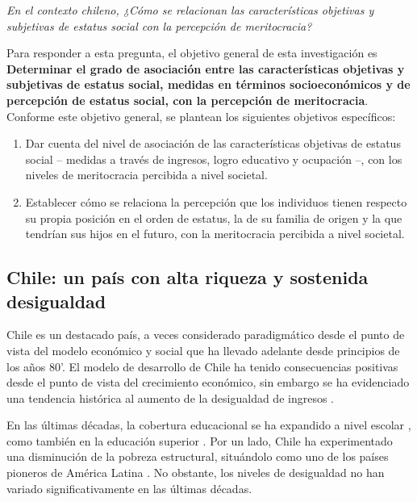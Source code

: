 \documentclass[12pt]{article}
\begin{document}
\begin{center}
\textit{En el contexto chileno, ¿Cómo se relacionan las características objetivas y subjetivas de estatus social con la percepción de meritocracia?}
\end{center}
	
Para responder a esta pregunta, el objetivo general de esta investigación es \textbf{Determinar el grado de asociación entre las características objetivas y subjetivas de estatus social, medidas en términos socioeconómicos y de percepción de estatus social, con la percepción de meritocracia}. Conforme este objetivo general, se plantean los siguientes objetivos específicos:

\begin{enumerate}
\item Dar cuenta del nivel de asociación de las características objetivas de estatus social -- medidas a través de ingresos, logro educativo y ocupación --, con los niveles de meritocracia percibida a nivel societal.
\item Establecer cómo se relaciona la percepción que los individuos tienen respecto su propia posición en el orden de estatus, la de su familia de origen y la que tendrían sus hijos en el futuro, con la meritocracia percibida a nivel societal. 
\end{enumerate}

\newpage

\subsection{Chile: un país con alta riqueza y sostenida desigualdad}

Chile es un destacado país, a veces considerado paradigmático desde el punto de vista del modelo económico y social que ha llevado adelante desde principios de los años 80'\citep{Arrizabalo1995}. El modelo de desarrollo de Chile ha tenido consecuencias positivas desde el punto de vista del crecimiento económico, sin embargo se ha evidenciado una tendencia histórica al aumento de la desigualdad de ingresos \citep{Rodriguez2018}.

En las últimas décadas, la cobertura educacional se ha expandido a nivel escolar \citep{Bellei2015}, como también en la educación superior \citep{Bernasconi2017}. Por un lado, Chile ha experimentado una disminución de la pobreza estructural, situándolo como uno de los países pioneros de América Latina \citep{ocdeCL2018}. No obstante, los niveles de desigualdad no han variado significativamente en las últimas décadas. 
\end{document}
